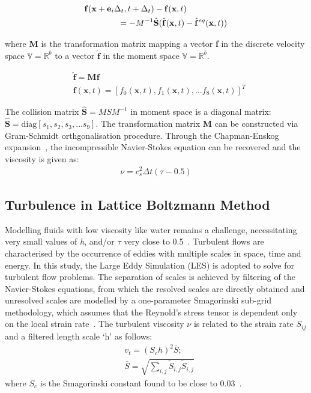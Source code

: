 \documentclass[12pt,a4paper,twocolumn,fleqn]{narms}
\begin{document}
\begin{align}
&\mathbf{f}(\mathbf{x}+\mathbf{e}_i\Delta_t, t+ \Delta_t)-\mathbf{f}(\mathbf{x},t) \nonumber \\
&\mbox{\qquad\qquad} = -M^{-1}\hat{\mathbf{S}} (\hat{\mathbf{f}}(\mathbf{x},t)-\hat{\mathbf{f}}^{eq}(\mathbf{x},t))
\end{align}

\noindent where \textbf{M} is the transformation matrix mapping a vector \textbf{f} in the discrete velocity space $\mathds{V}=\mathds{R}^b$ to a vector $\hat{\mathbf{f}}$ in the moment space $\mathds{V}=\mathds{R}^b$.

\begin{align}
&\hat{\mathbf{f}} = \mathbf{M}\mathbf{f}\\
&\mathbf{f}(\mathbf{x},t) = \left[f_0(\mathbf{x},t),f_1(\mathbf{x},t),\dots f_8(\mathbf{x},t)\right]^T
\end{align}

The collision matrix $\hat{\mathbf{S}} = MSM^{-1}$ in moment space is a diagonal matrix: $\hat{\mathbf{S}} =\mbox{diag} \left[ s_1, s_2, s_3,\dots s_9  \right]$. The transformation matrix \textbf{M} can be constructed via Gram-Schmidt orthgonalisation procedure. Through the Chapman-Enskog expansion~, the incompressible Navier-Stokes equation can be recovered and the viscosity is given as:
\begin{align}
\nu=c_s^2\Delta t(\tau-0.5)
\end{align}

\subsection{Turbulence in Lattice Boltzmann Method}
Modelling fluids with low viscosity like water remains a challenge, necessitating very small values of \textit{h}, and/or $\tau$ very close to 0.5~. Turbulent flows are characterised by the occurrence of eddies with multiple scales in space, time and energy. In this study, the Large Eddy Simulation (LES) is adopted to solve for turbulent flow problems. The separation of scales is achieved by filtering of the Navier-Stokes equations, from which the resolved scales are directly obtained and unresolved scales are modelled by a one-parameter Smagorinski sub-grid methodology, which assumes that the Reynold's stress tensor is dependent only on the local strain rate~. The turbulent viscosity $\nu$ is related to the strain rate $S_{ij}$ and a filtered length scale `h' as follows:
\begin{align}
&\mathit{v}_{\mathit{t}}  =  (\mathit{S}_{c}\mathit{h})^{2}\overline{S}; \\
&\overline{S}  = \sqrt{\sum\limits_{\mathit{i,j}}{\tilde{S}_{\mathit{i,j}}\tilde{S}_{\mathit{i,j}}}}
\end{align}
where $\mathit{S}_{c}$ is the Smagorinski constant found to be close to 0.03~.
\end{document}
